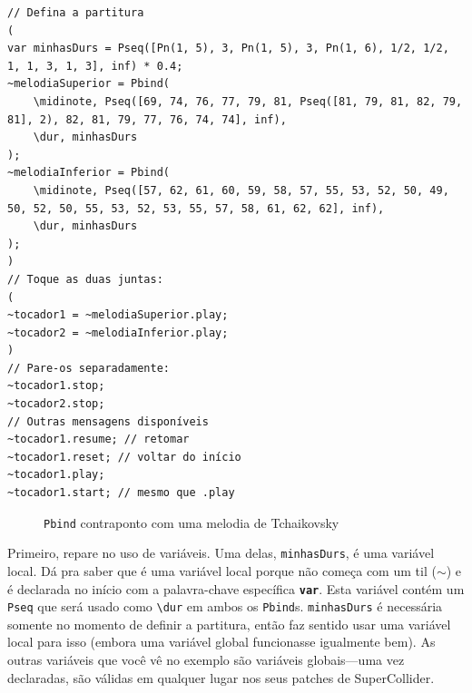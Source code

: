 %

\begin{lstlisting}[style=SuperCollider-IDE, basicstyle=\scttfamily\footnotesize]
// Defina a partitura
(
var minhasDurs = Pseq([Pn(1, 5), 3, Pn(1, 5), 3, Pn(1, 6), 1/2, 1/2, 1, 1, 3, 1, 3], inf) * 0.4;
~melodiaSuperior = Pbind(
	\midinote, Pseq([69, 74, 76, 77, 79, 81, Pseq([81, 79, 81, 82, 79, 81], 2), 82, 81, 79, 77, 76, 74, 74], inf),
	\dur, minhasDurs
);
~melodiaInferior = Pbind(
	\midinote, Pseq([57, 62, 61, 60, 59, 58, 57, 55, 53, 52, 50, 49, 50, 52, 50, 55, 53, 52, 53, 55, 57, 58, 61, 62, 62], inf),
	\dur, minhasDurs
);
)
// Toque as duas juntas:
(
~tocador1 = ~melodiaSuperior.play;
~tocador2 = ~melodiaInferior.play;
)
// Pare-os separadamente:
~tocador1.stop;
~tocador2.stop;
// Outras mensagens disponíveis
~tocador1.resume; // retomar
~tocador1.reset; // voltar do início
~tocador1.play;
~tocador1.start; // mesmo que .play
\end{lstlisting}

\begin{figure}[h]
\centerline{}
\caption{\texttt{Pbind} contraponto com uma melodia de Tchaikovsky}
\label{fig:counterpoint}
\end{figure}

Primeiro, repare no uso de variáveis. Uma delas, \texttt{minhasDurs}, é uma variável local. Dá pra saber que é uma variável local porque não começa com um til ($\sim$) e é declarada no início com a palavra-chave específica \texttt{\textbf{var}}. Esta variável contém um \texttt{Pseq} que será usado como \texttt{\textbackslash dur} em ambos os \texttt{Pbind}s. \texttt{minhasDurs} é necessária somente no momento de definir a partitura, então faz sentido usar uma variável local para isso (embora uma variável global funcionasse igualmente bem). As outras variáveis que você vê no exemplo são variáveis globais---uma vez declaradas, são válidas em qualquer lugar nos seus patches de SuperCollider.

